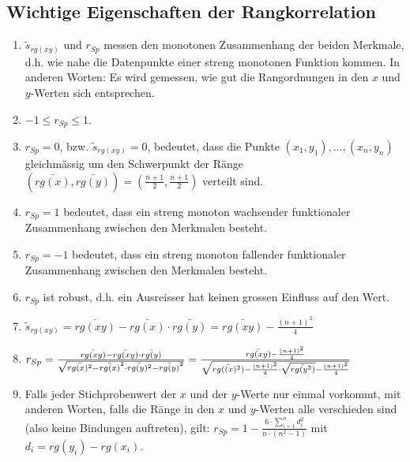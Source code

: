 \subsection{Wichtige Eigenschaften der Rangkorrelation}
\label{sec:desk_statistik_rangkorrelation_eigenschaften}
\begin{enumerate}
    \item $\tilde{s}_{rg(xy)}$ und $r_{Sp}$ messen den monotonen Zusammenhang der beiden Merkmale, 
        d.h. wie nahe die Datenpunkte einer streng monotonen Funktion kommen. In anderen Worten: Es wird
        gemessen, wie gut die Rangordnungen in den $x$ und $y$-Werten sich entsprechen.
    \item $-1 \leq r_{Sp} \leq 1$.
    \item $r_{Sp} = 0$, bzw. $\tilde{s}_{rg(xy)} = 0$, bedeutet, 
        dass die Punkte $(x_1, y_1), \dots, (x_n,y_n)$ gleichmässig um den Schwerpunkt der Ränge
        $(\bar{rg(x)}, \bar{rg(y)}) = (\frac{n+1}{2}, \frac{n+1}{2})$ verteilt sind.
    \item $r_{Sp} = 1$ bedeutet, dass ein streng monoton wachsender funktionaler Zusammenhang 
        zwischen den Merkmalen besteht.
    \item $r_{Sp} = -1$ bedeutet, dass ein streng monoton fallender funktionaler Zusammenhang
        zwischen den Merkmalen besteht.
    \item $r_{Sp}$ ist robust, d.h. ein Ausreisser hat keinen grossen Einfluss auf den Wert.
    \item $\tilde{s}_{rg(xy)} = \bar{rg(xy)} - \bar{rg(x)} \cdot \bar{rg(y)} = \bar{rg(xy)} - \frac{(n+1)^2}{4}$
    \item $r_{Sp} = \frac{\bar{rg(xy)} - \bar{rg(xy)} \cdot \bar{rg(y)}}{\sqrt{\bar{rg(x)^2} - \bar{rg(x)}^2 \cdot \bar{rg(y)^2} - \bar{rg(y)}^2}} \\
        = \frac{\bar{rg(xy)} - \frac{(n+1)^2}{4}}{\sqrt{\bar{rg((x)^2)} - \frac{(n+1)^2}{4} \cdot \sqrt{\bar{rg(y^2)}} - \frac{(n+1)^2}{4}}}$
    \item Falls jeder Stichprobenwert der $x$ und der $y$-Werte nur einmal vorkommt, mit anderen Worten, falls die Ränge in den 
        $x$ und $y$-Werten alle verschieden sind (also keine Bindungen auftreten), gilt: $r_{Sp} = 1 - \frac{6 \cdot \sum_{i=1}^n  d_i^2}{n \cdot (n^2 - 1)}$
        mit $d_i = rg(y_i) - rg(x_i)$.
\end{enumerate}